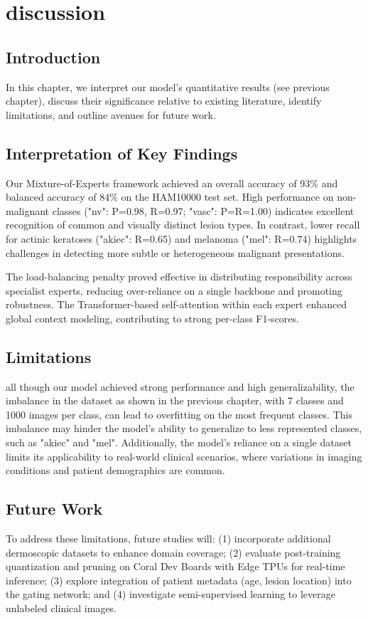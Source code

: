 \chapter{discussion}

\newpage

\section{Introduction}
In this chapter, we interpret our model’s quantitative results (see previous chapter), discuss their significance relative to existing literature, identify limitations, and outline avenues for future work.

\section{Interpretation of Key Findings}
Our Mixture-of-Experts framework achieved an overall accuracy of 93\% and balanced accuracy of 84\% on the HAM10000 test set. High performance on non-malignant classes ("nv": P=0.98, R=0.97; "vasc": P=R=1.00) indicates excellent recognition of common and visually distinct lesion types. In contrast, lower recall for actinic keratoses ("akiec": R=0.65) and melanoma ("mel": R=0.74) highlights challenges in detecting more subtle or heterogeneous malignant presentations.

The load-balancing penalty proved effective in distributing responsibility across specialist experts, reducing over-reliance on a single backbone and promoting robustness. The Transformer-based self-attention within each expert enhanced global context modeling, contributing to strong per-class F1-scores.


\section{Limitations}
all though our model achieved strong performance and high generalizability, the imbalance in the dataset as shown in the previous chapter, with 7 classes and 1000 images per class, can lead to overfitting on the most frequent classes. This imbalance may hinder the model's ability to generalize to less represented classes, such as "akiec" and "mel". Additionally, the model's reliance on a single dataset limits its applicability to real-world clinical scenarios, where variations in imaging conditions and patient demographics are common.    
\section{Future Work}
To address these limitations, future studies will: (1) incorporate additional dermoscopic datasets to enhance domain coverage; (2) evaluate post-training quantization and pruning on Coral Dev Boards with Edge TPUs for real-time inference; (3) explore integration of patient metadata (age, lesion location) into the gating network; and (4) investigate semi-supervised learning to leverage unlabeled clinical images.

